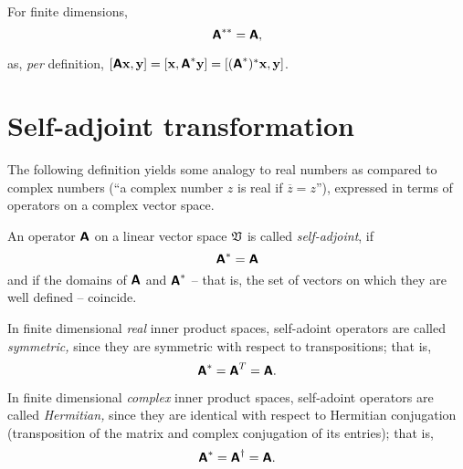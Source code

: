 For finite dimensions,
\begin{equation}
\textsf{\textbf{A}}^{\ast \ast}=
\textsf{\textbf{A}},
\end{equation}

{\color{OliveGreen}\bproof
as, {\it per} definition,
$
[\textsf{\textbf{A}}{\bf x}, {\bf y}]
=
[{\bf x}, \textsf{\textbf{A}}^\ast{\bf y}]
=
[(\textsf{\textbf{A}}^\ast)^\ast{\bf x}, {\bf y}]
$.
\eproof
}


\section{Self-adjoint transformation}
\label{2015-m-ch-fdlvs-self-adjoint}



The following definition yields some analogy to real numbers as compared to complex numbers
(``a complex number $z$ is real if $\overline{z}=z$''),
expressed in terms of operators on a complex vector space.


An operator    $\textsf{\textbf{A}}$   on a linear vector space   ${\frak V}$
is called {\em self-adjoint}, if
\begin{equation}
\textsf{\textbf{A}}^{\ast}=
\textsf{\textbf{A}}
\end{equation}
and if the domains of $\textsf{\textbf{A}}$ and $\textsf{\textbf{A}}^{\ast}$
-- that is, the set of vectors on which they are well defined -- coincide.

In finite dimensional {\em real} inner product spaces,
self-adoint operators are called {\em symmetric,}
since they are symmetric with respect to transpositions; that is,
\begin{equation}
\textsf{\textbf{A}}^{\ast}= \textsf{\textbf{A}}^{T}=
\textsf{\textbf{A}}.
\end{equation}

In finite dimensional
{\em complex} inner product spaces,
self-adoint operators are called {\em Hermitian,}
since they are identical with respect to Hermitian conjugation (transposition of the matrix and complex conjugation of its
entries); that is,
\begin{equation}
\textsf{\textbf{A}}^{\ast}= \textsf{\textbf{A}}^{\dagger}=
\textsf{\textbf{A}}.
\end{equation}

